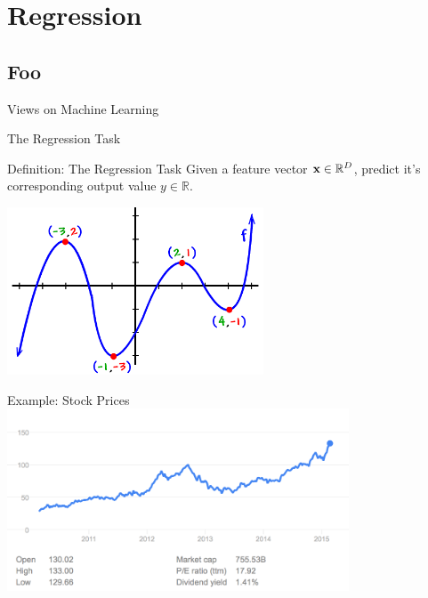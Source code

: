 \documentclass[serif,xcolor=pdftex,dvipsnames,table,hyperref={bookmarks=false,breaklinks}]{beamer}
\begin{document}
\maketitlepage

\section{Regression}
\subsection{Foo}

\begin{frame}[t]{Views on Machine Learning}


\end{frame}

\begin{frame}[t]{The Regression Task}

\begin{block}{Definition: The Regression Task}
Given a feature vector ${\mathbf{x}}\in\mathbb{R}^D$, predict it's corresponding output value $y\in \mathbb{R}$.
\end{block}

\pause
\center
\includegraphics[width=3in]{../Figures/polynomial-function.png}
\end{frame}

\begin{frame}[t]{Example: Stock Prices}
\center
\includegraphics[width=4in]{../Figures/apple-stock.png}
\end{frame}
\end{document}
